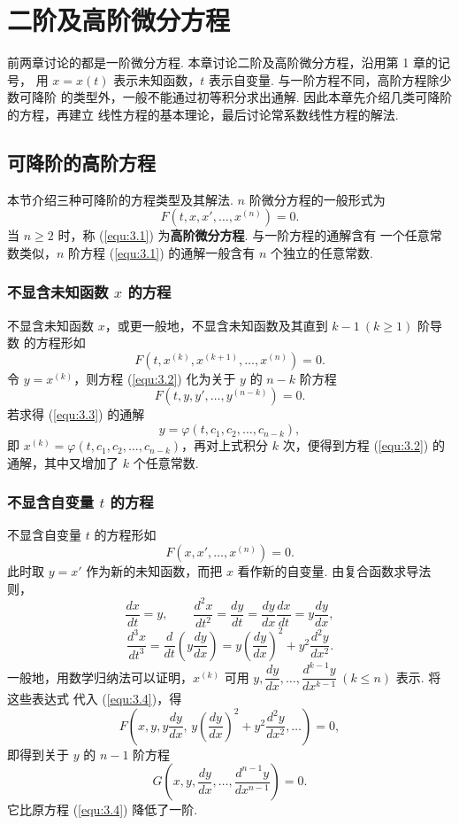 \chapter{二阶及高阶微分方程}
前两章讨论的都是一阶微分方程. 本章讨论二阶及高阶微分方程，沿用第 1 章的记号，
用 $x=x(t)$ 表示未知函数，$t$ 表示自变量. 与一阶方程不同，高阶方程除少数可降阶
的类型外，一般不能通过初等积分求出通解. 因此本章先介绍几类可降阶的方程，再建立
线性方程的基本理论，最后讨论常系数线性方程的解法.

\section{可降阶的高阶方程}\label{sec:3.1}
本节介绍三种可降阶的方程类型及其解法. $n$ 阶微分方程的一般形式为
\begin{equation}\label{equ:3.1}
F(t,x,x',\dots,x^{(n)})=0.
\end{equation}
当 $n\ge2$ 时，称 (\ref{equ:3.1}) 为\textbf{高阶微分方程}. 与一阶方程的通解含有
一个任意常数类似，$n$ 阶方程 (\ref{equ:3.1}) 的通解一般含有 $n$ 个独立的任意常数.

\subsection{不显含未知函数 $x$ 的方程}
不显含未知函数 $x$，或更一般地，不显含未知函数及其直到 $k-1\ (k\ge1)$ 阶导数
的方程形如
\begin{equation}\label{equ:3.2}
F(t,x^{(k)},x^{(k+1)},\dots,x^{(n)})=0.
\end{equation}
令 $y=x^{(k)}$，则方程 (\ref{equ:3.2}) 化为关于 $y$ 的 $n-k$ 阶方程
\begin{equation}\label{equ:3.3}
F(t,y,y',\dots,y^{(n-k)})=0.
\end{equation}
若求得 (\ref{equ:3.3}) 的通解
\[
y=\varphi(t,c_1,c_2,\dots,c_{n-k}),
\]
即 $x^{(k)}=\varphi(t,c_1,c_2,\dots,c_{n-k})$，再对上式积分 $k$ 次，便得到方程
(\ref{equ:3.2}) 的通解，其中又增加了 $k$ 个任意常数.

\subsection{不显含自变量 $t$ 的方程}
不显含自变量 $t$ 的方程形如
\begin{equation}\label{equ:3.4}
F(x,x',\dots,x^{(n)})=0.
\end{equation}
此时取 $y=x'$ 作为新的未知函数，而把 $x$ 看作新的自变量. 由复合函数求导法则，
\[
\frac{dx}{dt}=y,\qquad
\frac{d^2x}{dt^2}=\frac{dy}{dt}=\frac{dy}{dx}\frac{dx}{dt}=y\frac{dy}{dx},
\]
\[
\frac{d^3x}{dt^3}=\frac{d}{dt}\left(y\frac{dy}{dx}\right)
=y\left(\frac{dy}{dx}\right)^2+y^2\frac{d^2y}{dx^2}.
\]
一般地，用数学归纳法可以证明，$x^{(k)}$ 可用
$y,\dfrac{dy}{dx},\dots,\dfrac{d^{k-1}y}{dx^{k-1}}\ (k\le n)$ 表示. 将这些表达式
代入 (\ref{equ:3.4})，得
\[
F\left(x,y,y\frac{dy}{dx},\,y\left(\frac{dy}{dx}\right)^2
+y^2\frac{d^2y}{dx^2},\dots\right)=0,
\]
即得到关于 $y$ 的 $n-1$ 阶方程
\begin{equation}\label{equ:3.5}
G\left(x,y,\frac{dy}{dx},\dots,\frac{d^{n-1}y}{dx^{n-1}}\right)=0.
\end{equation}
它比原方程 (\ref{equ:3.4}) 降低了一阶.


